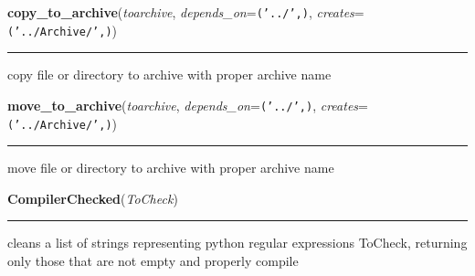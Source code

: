     \label{System:Utils:copy_to_archive}

    \vspace{0.5ex}

\hspace{.8\funcindent}\begin{boxedminipage}{\funcwidth}

    \raggedright \textbf{copy\_to\_archive}(\textit{toarchive}, \textit{depends\_on}={\tt ('../',)}, \textit{creates}={\tt ('../Archive/',)})

    \vspace{-1.5ex}

    \rule{\textwidth}{0.5\fboxrule}
\setlength{\parskip}{2ex}
    copy file or directory to archive with proper archive name

\setlength{\parskip}{1ex}
    \end{boxedminipage}

    \label{System:Utils:move_to_archive}

    \vspace{0.5ex}

\hspace{.8\funcindent}\begin{boxedminipage}{\funcwidth}

    \raggedright \textbf{move\_to\_archive}(\textit{toarchive}, \textit{depends\_on}={\tt ('../',)}, \textit{creates}={\tt ('../Archive/',)})

    \vspace{-1.5ex}

    \rule{\textwidth}{0.5\fboxrule}
\setlength{\parskip}{2ex}
    move file or directory to archive with proper archive name

\setlength{\parskip}{1ex}
    \end{boxedminipage}

    \label{System:Utils:CompilerChecked}

    \vspace{0.5ex}

\hspace{.8\funcindent}\begin{boxedminipage}{\funcwidth}

    \raggedright \textbf{CompilerChecked}(\textit{ToCheck})

    \vspace{-1.5ex}

    \rule{\textwidth}{0.5\fboxrule}
\setlength{\parskip}{2ex}
    cleans a list of strings representing python regular expressions 
    ToCheck, returning only those that are not empty and properly compile

\setlength{\parskip}{1ex}
    \end{boxedminipage}

